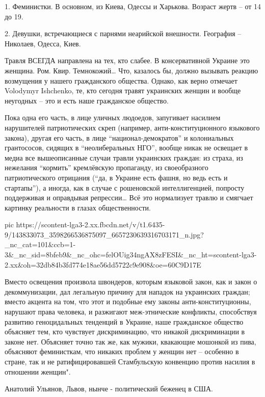 1. Феминистки. В основном, из Киева, Одессы и Харькова. Возраст жертв – от 14 до 19.

2. Девушки, встречающиеся с парнями неарийской внешности. География – Николаев,
Одесса, Киев.

Травля ВСЕГДА направлена на тех, кто слабее. В консервативной Украине это
женщина. Ром. Квир. Темнокожий… Что, казалось бы, должно вызывать реакцию
возмущения у нашего гражданского общества. Однако, как верно отмечает Volodymyr
Ishchenko, те, кто сегодня травят украинских женщин и вообще неугодных – это и
есть наше гражданское общество. 

Пока одна его часть, в лице уличных людоедов, запугивает насилием нарушителей
патриотических скреп (например, анти-конституционного языкового закона), другая
его часть, в лице \enquote{национал-демократов} и колониальных грантососов, сидящих в
\enquote{неолиберальных НГО}, вообще никак не освещает в медиа все вышеописанные случаи
травли украинских граждан: из страха, из нежелания \enquote{кормить} кремлёвскую
пропаганду, из своеобразного патриотического отрицания (\enquote{да, в Украине есть
фашня, но ведь есть и стартапы}), а иногда, как в случае с рошеновской
интеллигенцией, попросту поддерживая и оправдывая репрессии… Всё это
нормализует травлю и смягчает картинку реальности в глазах общественности. 

\ifcmt
  pic https://scontent-lga3-2.xx.fbcdn.net/v/t1.6435-9/143833073_3598266536875097_6657230639316703171_n.jpg?_nc_cat=101&ccb=1-3&_nc_sid=8bfeb9&_nc_ohc=felOUig34ngAX8zFESI&_nc_ht=scontent-lga3-2.xx&oh=32db84b3fd774e18ae56dd5722c9e908&oe=60C9D17E
\fi

Вместо освещения произвола швондеров, которым языковой закон, как и закон о
декоммунизации, дал легальную причину для нападок на украинских граждан; вместо
акцента на том, что этот и подобные ему законы анти-конституционны, нарушают
права человека, и разжигают меж-этнические конфликты, способствуя развитию
геноцидальных тенденций в Украине, наше гражданское общество объясняет тем, кто
чувствует дискриминацию, что никакой дискриминации в законе нет. Объясняет
точно так же, как мужики, квакающие мошонкой из пива, объясняют феминисткам,
что никаких проблем у женщин нет – особенно в стране, так и не ратифицировавшей
Стамбульскую конвенцию против насилия в отношении женщин".

Анатолий Ульянов, Львов, нынче - политический беженец в США.
